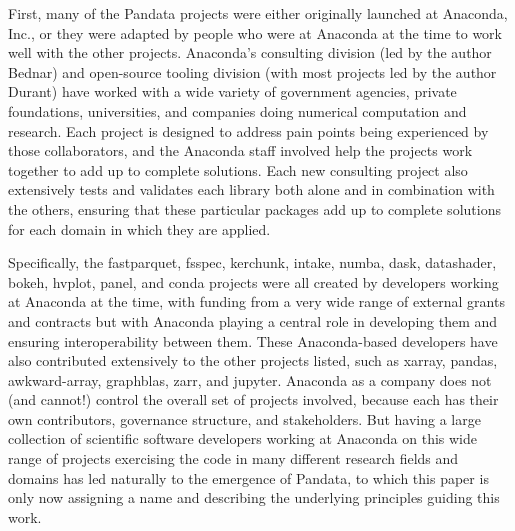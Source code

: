 First, many of the Pandata projects were either originally launched at Anaconda, Inc., or they were adapted by people who were at Anaconda at the time to work well with the other projects. Anaconda's consulting division (led by the author Bednar) and open-source tooling division (with most projects led by the author Durant) have worked with a wide variety of government agencies, private foundations, universities, and companies doing numerical computation and research. Each project is designed to address pain points being experienced by those collaborators, and the Anaconda staff involved help the projects work together to add up to complete solutions. Each new consulting project also extensively tests and validates each library both alone and in combination with the others, ensuring that these particular packages add up to complete solutions for each domain in which they are applied.

Specifically, the fastparquet, fsspec, kerchunk, intake, numba, dask, datashader, bokeh, hvplot, panel, and conda projects were all created by developers working at Anaconda at the time, with funding from a very wide range of external grants and contracts but with Anaconda playing a central role in developing them and ensuring interoperability between them. These Anaconda-based developers have also contributed extensively to the other projects listed, such as xarray, pandas, awkward-array, graphblas, zarr, and jupyter. Anaconda as a company does not (and cannot!) control the overall set of projects involved, because each has their own contributors, governance structure, and stakeholders. But having a large collection of scientific software developers working at Anaconda on this wide range of projects exercising the code in many different research fields and domains has led naturally to the emergence of Pandata, to which this paper is only now assigning a name and describing the underlying principles guiding this work.

